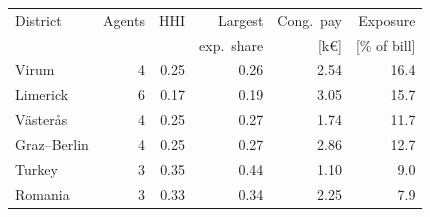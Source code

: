 \begin{tabular*}{\textwidth}{@{\extracolsep{\fill}}lrrrrr@{}}
\toprule
District & Agents & HHI & Largest & Cong.\ pay & Exposure \\
 & & & exp.\ share & [k\euro] & [\% of bill] \\
\midrule
Virum & 4 & 0.25 & 0.26 & 2.54 & 16.4 \\
Limerick & 6 & 0.17 & 0.19 & 3.05 & 15.7 \\
V\"aster\aa s & 4 & 0.25 & 0.27 & 1.74 & 11.7 \\
Graz--Berlin & 4 & 0.25 & 0.27 & 2.86 & 12.7 \\
Turkey & 3 & 0.35 & 0.44 & 1.10 & 9.0 \\
Romania & 3 & 0.33 & 0.34 & 2.25 & 7.9 \\
\bottomrule
\end{tabular*}
